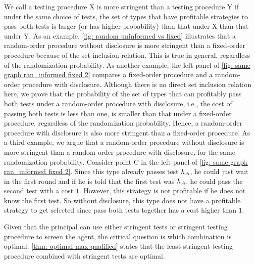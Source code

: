     We call a testing procedure X is more stringent than a testing procedure Y if under the same choice of tests,  the set of types that have profitable strategies to pass both tests is larger (or has higher probability) than that under X than that under Y.  As an example, \cref{fig: random uninformed vs fixed} illustrates that a random-order procedure without disclosure is more stringent than a fixed-order procedure because of the set inclusion relation. This is true in general, regardless of the randomization probability.
    As another example, the left panel of \cref{fig: same graph ran_informed fixed 2} compares a fixed-order procedure and a random-order procedure with disclosure. Although there is no direct set inclusion relation here, we prove that the probability of the set of types that can profitably pass both tests under a random-order procedure with disclosure, i.e., the cost of passing both tests is less than one, is smaller than that under a fixed-order procedure, regardless of the randomization probability.
    Hence, a random-order procedure with disclosure is also more stringent than a fixed-order procedure.
    As a third example, we argue that a random-order procedure without disclosure is more stringent than a random-order procedure with disclosure, for the same randomization probability. Consider  point C  in the left panel of \cref{fig: same graph ran_informed fixed 2}. Since this type already passes test $h_A$, he could just wait in the first round and if he is told that the first test was $h_A$, he could pass the second test with a cost $1$. However, this strategy is not profitable if he does not know the first test.
    So without disclosure, this type does not have a profitable strategy to get selected since pass both tests together has a cost higher than $1$.
    
    Given that the principal can use either stringent tests or stringent testing procedure to screen the agent, the critical question is which combination is optimal. \cref{thm: optimal max qualified} states that the least stringent testing procedure combined with stringent tests are optimal.





